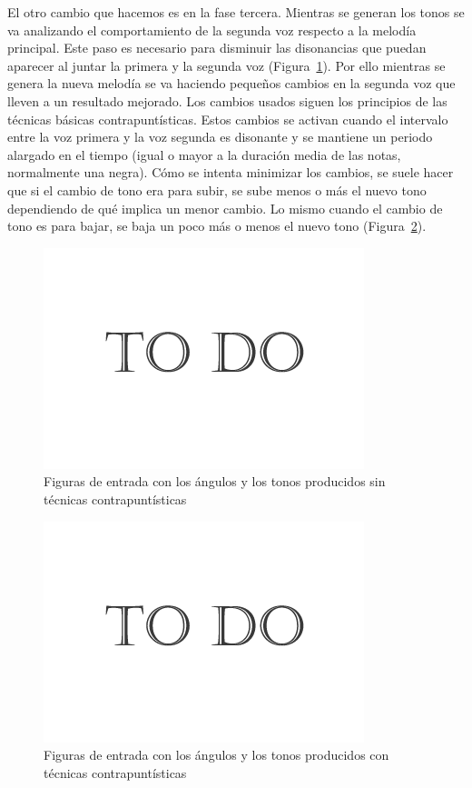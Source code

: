 El otro cambio que hacemos es en la fase tercera. Mientras se generan los tonos se va analizando el comportamiento de la segunda voz respecto a la melodía principal. Este paso es necesario para disminuir las disonancias que puedan aparecer al juntar la primera y la segunda voz (Figura~\ref{fig:Figura2Voz2}). Por ello mientras se genera la nueva melodía se va haciendo pequeños cambios en la segunda voz que lleven a un resultado mejorado. Los cambios usados siguen los principios de las técnicas básicas contrapuntísticas. Estos cambios se activan cuando el intervalo entre la voz primera y la voz segunda es disonante y se mantiene un periodo alargado en el tiempo (igual o mayor a la duración media de las notas, normalmente una negra). Cómo se intenta minimizar los cambios, se suele hacer que si el cambio de tono era para subir, se sube menos o más el nuevo tono dependiendo de qué implica un menor cambio. Lo mismo cuando el cambio de tono es para bajar, se baja un poco más o menos el nuevo tono (Figura~\ref{fig:Figura3Voz2}).

		\begin{figure}[htbp]
		\centering
		\hspace*{0.0in}
		\includegraphics[scale=0.57]{graphics/todo.png}
		\caption{Figuras de entrada con los ángulos y los tonos producidos sin técnicas contrapuntísticas}
		\label{fig:Figura2Voz2}
		\end{figure}

		\begin{figure}[htbp]
		\centering
		\hspace*{0.0in}
		\includegraphics[scale=0.57]{graphics/todo.png}
		\caption{Figuras de entrada con los ángulos y los tonos producidos con técnicas contrapuntísticas}
		\label{fig:Figura3Voz2}
		\end{figure}

